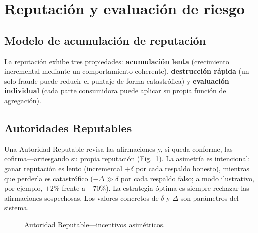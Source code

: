 \documentclass[11pt,a4paper,twocolumn]{article}
\begin{document}
\section{Reputación y evaluación de riesgo}

\subsection{Modelo de acumulación de reputación}

La reputación exhibe tres propiedades: \textbf{acumulación lenta} (crecimiento incremental mediante un comportamiento coherente), \textbf{destrucción rápida} (un solo fraude puede reducir el puntaje de forma catastrófica) y \textbf{evaluación individual} (cada parte consumidora puede aplicar su propia función de agregación).

\subsection{Autoridades Reputables}

Una Autoridad Reputable revisa las afirmaciones y, si queda conforme, las cofirma---arriesgando su propia reputación (Fig.~\ref{fig:authority}). La asimetría es intencional: ganar reputación es lento (incremental $+\delta$ por cada respaldo honesto), mientras que perderla es catastrófico ($-\Delta \gg \delta$ por cada respaldo falso; a modo ilustrativo, por ejemplo, $+2\%$ frente a $-70\%$). La estrategia óptima es siempre rechazar las afirmaciones sospechosas. Los valores concretos de $\delta$ y $\Delta$ son parámetros del sistema.

\begin{figure}[ht]
\centering
{}
\caption{Autoridad Reputable---incentivos asimétricos.}
\label{fig:authority}
\end{figure}
\end{document}
